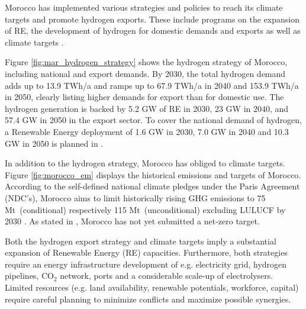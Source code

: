 Morocco has implemented various strategies and policies to reach its climate targets and promote hydrogen exports. These include programs on the expansion of RE, the development of hydrogen for domestic demands and exports as well as climate targets \cite{MarHyStrat2021, CAT2021}.


Figure \ref{fig:mar_hydrogen_strategy} shows the hydrogen strategy of Morocco, including national and export demands.
By 2030, the total hydrogen demand adds up to 13.9 TWh/a and ramps up to 67.9 TWh/a in 2040 and 153.9 TWh/a in 2050, 
clearly listing higher demands for export than for domestic use. The hydrogen generation is backed by 5.2 GW of RE in 2030, 23 GW in 2040, and 57.4 GW in 2050 in the export sector. To cover the national demand of hydrogen, a Renewable Energy deployment of 1.6 GW in 2030, 7.0 GW in 2040 and 10.3 GW in 2050 is planned in \cite{MarHyStrat2021}.


In addition to the hydrogen strategy, Morocco has obliged to climate targets. Figure \ref{fig:morocco_em} displays the historical emissions and targets of Morocco.
According to the self-defined national climate pledges under the Paris Agreement (NDC's), Morocco aims to limit historically rising GHG emissions to 75 Mt\coe\ (conditional) respectively 115 Mt\coe\ (unconditional) excluding LULUCF by 2030 \cite{CAT2021}. 
As stated in \cite{CAT2021}, Morocco has not yet submitted a net-zero target. 

Both the hydrogen export strategy and climate targets imply a substantial expansion of Renewable Energy (RE) capacities. Furthermore, both strategies require an energy infrastructure development of e.g. electricity grid, hydrogen pipelines, $\mathrm{CO_2}$ network, ports and a considerable scale-up of electrolysers.
Limited resources (e.g. land availability, renewable potentials, workforce, capital) require careful planning to minimize conflicts and maximize possible synergies.

